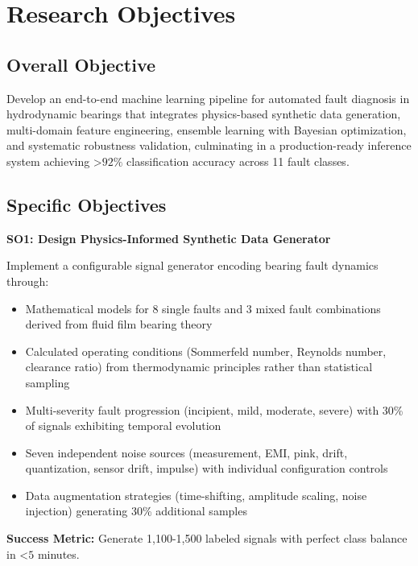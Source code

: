 \documentclass[11pt,a4paper]{article}
\begin{document}
\section{Research Objectives}

\subsection{Overall Objective}

Develop an end-to-end machine learning pipeline for automated fault diagnosis in hydrodynamic bearings that integrates physics-based synthetic data generation, multi-domain feature engineering, ensemble learning with Bayesian optimization, and systematic robustness validation, culminating in a production-ready inference system achieving $ $>$ 92\%$ classification accuracy across 11 fault classes.

\subsection{Specific Objectives}

\textbf{SO1: Design Physics-Informed Synthetic Data Generator}

Implement a configurable signal generator encoding bearing fault dynamics through:
\begin{itemize}[itemsep=0.2em]
    \item Mathematical models for 8 single faults and 3 mixed fault combinations derived from fluid film bearing theory
    \item Calculated operating conditions (Sommerfeld number, Reynolds number, clearance ratio) from thermodynamic principles rather than statistical sampling
    \item Multi-severity fault progression (incipient, mild, moderate, severe) with 30\% of signals exhibiting temporal evolution
    \item Seven independent noise sources (measurement, EMI, pink, drift, quantization, sensor drift, impulse) with individual configuration controls
    \item Data augmentation strategies (time-shifting, amplitude scaling, noise injection) generating 30\% additional samples
\end{itemize}

\textbf{Success Metric:} Generate 1,100-1,500 labeled signals with perfect class balance in $ $<$  5$ minutes.
\end{document}
